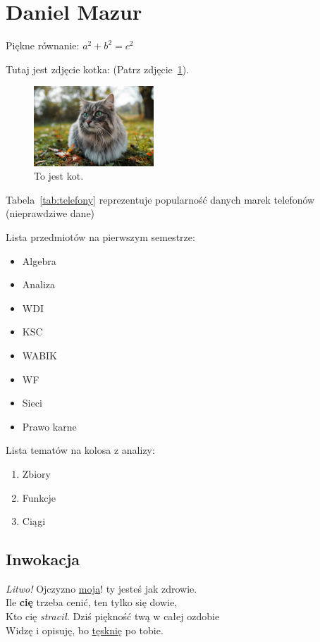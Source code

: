 \newpage
\section{Daniel Mazur}
\label{sec:pawljmlo}

Piękne równanie:
\begin{math}
a^2 + b^2 = c^2
\end{math}

\vspace{5mm} %

Tutaj jest zdjęcie kotka: (Patrz zdjęcie~\ref{fig:kot}).

\begin{figure}[htbp] 
    \centering
    \includegraphics[width=0.4\textwidth]{pictures/kot xd.jpg}
    \caption{To jest kot.}
    \label{fig:kot}
\end{figure}


Tabela~\ref{tab:telefony} reprezentuje popularność danych marek telefonów (nieprawdziwe dane)


Lista przedmiotów na pierwszym semestrze:
\begin{itemize}
    \item Algebra
    \item Analiza
    \item WDI
    \item KSC
    \item WABIK
    \item WF
    \item Sieci
    \item Prawo karne
\end{itemize}
\newpage
Lista tematów na kolosa z analizy:
\begin{enumerate}
    \item Zbiory
    \item Funkcje
    \item Ciągi
\end{enumerate}

\begin{center}
\section*{Inwokacja}

\emph{Litwo!} Ojczyzno \underline{moja}! ty jesteś jak zdrowie.\\
Ile \textbf{cię} trzeba cenić, ten tylko się dowie,\\

Kto cię \emph{stracił}. Dziś piękność twą w całej ozdobie\\
Widzę i opisuję, bo \underline{tęsknię} po tobie.\\
\end{center}


